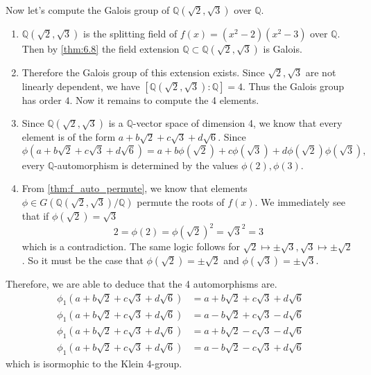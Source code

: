   \begin{example}
    Now let's compute the Galois group of $\mathbb{Q}(\sqrt{2}, \sqrt{3})$ over $\mathbb{Q}$. 
    \begin{enumerate}
      \item $\mathbb{Q}(\sqrt{2}, \sqrt{3})$ is the splitting field of $f(x) = (x^2 - 2)(x^2 - 3)$ over $\mathbb{Q}$. Then by \ref{thm:6.8} the field extension $\mathbb{Q} \subset \mathbb{Q}(\sqrt{2}, \sqrt{3})$ is Galois. 

      \item Therefore the Galois group of this extension exists. Since $\sqrt{2}, \sqrt{3}$ are not linearly dependent, we have $[\mathbb{Q}(\sqrt{2}, \sqrt{3}):\mathbb{Q}] = 4$. Thus the Galois group has order $4$. Now it remains to compute the 4 elements. 

      \item Since $\mathbb{Q}(\sqrt{2}, \sqrt{3})$ is a $\mathbb{Q}$-vector space of dimension 4, we know that every element is of the form $a + b \sqrt{2} + c \sqrt{3} + d \sqrt{6}$. Since 
      \begin{equation}
        \phi(a + b \sqrt{2} + c \sqrt{3} + d \sqrt{6}) = a + b \phi(\sqrt{2}) + c \phi(\sqrt{3}) + d \phi(\sqrt{2}) \phi(\sqrt{3}), 
      \end{equation}
      every $\mathbb{Q}$-automorphism is determined by the values $\phi(2), \phi(3)$. 

      \item From \ref{thm:f_auto_permute}, we know that elements $\phi \in G(\mathbb{Q}(\sqrt{2}, \sqrt{3}) / \mathbb{Q})$ permute the roots of $f(x)$. We immediately see that if $\phi(\sqrt{2}) = \sqrt{3}$
      \begin{equation}
        2 = \phi(2) = \phi(\sqrt{2})^2 = \sqrt{3}^2 = 3
      \end{equation}
      which is a contradiction. The same logic follows for $\sqrt{2} \mapsto \pm \sqrt{3}, \sqrt{3} \mapsto \pm \sqrt{2}$. So it must be the case that $\phi(\sqrt{2}) = \pm \sqrt{2}$ and $\phi(\sqrt{3}) = \pm \sqrt{3}$. 
    \end{enumerate}
    Therefore, we are able to deduce that the 4 automorphisms are. 
    \begin{align}
      \phi_1 (a + b \sqrt{2} + c \sqrt{3} + d \sqrt{6}) & = a + b \sqrt{2} + c \sqrt{3} + d \sqrt{6} \\
      \phi_1 (a + b \sqrt{2} + c \sqrt{3} + d \sqrt{6}) & = a - b \sqrt{2} + c \sqrt{3} - d \sqrt{6} \\
      \phi_1 (a + b \sqrt{2} + c \sqrt{3} + d \sqrt{6}) & = a + b \sqrt{2} - c \sqrt{3} - d \sqrt{6} \\
      \phi_1 (a + b \sqrt{2} + c \sqrt{3} + d \sqrt{6}) & = a - b \sqrt{2} - c \sqrt{3} + d \sqrt{6}
    \end{align}
    which is isormophic to the Klein 4-group. 
  \end{example}

